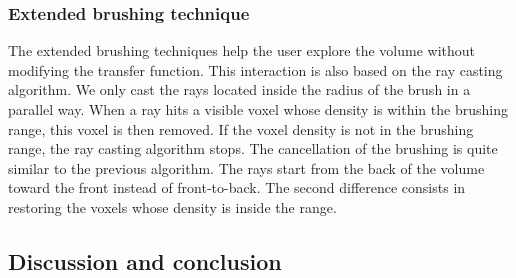\subsubsection{Extended brushing technique}

The extended brushing techniques help the user explore the volume without modifying the transfer function. This interaction is also based on the ray casting algorithm. We only cast the rays located inside the radius of the brush in a parallel way.
When a ray hits a visible voxel whose density is within the brushing range, this voxel is then removed. If the voxel density is not in the brushing range, the ray casting algorithm stops.
The cancellation of the brushing is quite similar to the previous algorithm. The rays start from the back of the volume toward the front instead of front-to-back. The second difference consists in restoring the voxels whose density is inside the range.

\subsection{Discussion and conclusion}

